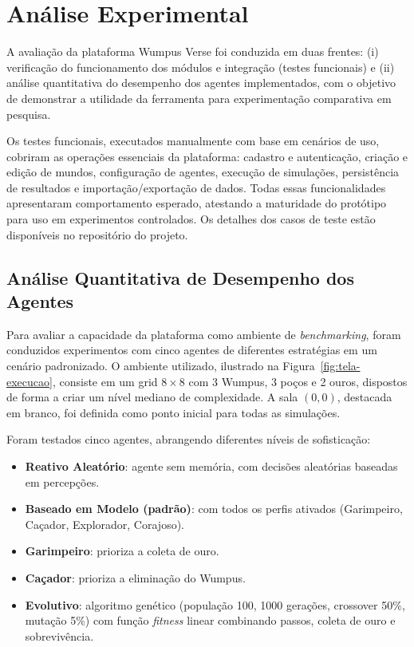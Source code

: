 \section{Análise Experimental}

A avaliação da plataforma Wumpus Verse foi conduzida em duas frentes: (i) verificação do funcionamento dos módulos e integração (testes funcionais) e (ii) análise quantitativa do desempenho dos agentes implementados, com o objetivo de demonstrar a utilidade da ferramenta para experimentação comparativa em pesquisa.

Os testes funcionais, executados manualmente com base em cenários de uso, cobriram as operações essenciais da plataforma: cadastro e autenticação, criação e edição de mundos, configuração de agentes, execução de simulações, persistência de resultados e importação/exportação de dados. Todas essas funcionalidades apresentaram comportamento esperado, atestando a maturidade do protótipo para uso em experimentos controlados. Os detalhes dos casos de teste estão disponíveis no repositório do projeto.

\subsection{Análise Quantitativa de Desempenho dos Agentes}

Para avaliar a capacidade da plataforma como ambiente de \textit{benchmarking}, foram conduzidos experimentos com cinco agentes de diferentes estratégias em um cenário padronizado. O ambiente utilizado, ilustrado na Figura~\ref{fig:tela-execucao}, consiste em um grid $8 \times 8$ com 3 Wumpus, 3 poços e 2 ouros, dispostos de forma a criar um nível mediano de complexidade. A sala $(0,0)$, destacada em branco, foi definida como ponto inicial para todas as simulações.

Foram testados cinco agentes, abrangendo diferentes níveis de sofisticação:

\begin{itemize}
    \item \textbf{Reativo Aleatório}: agente sem memória, com decisões aleatórias baseadas em percepções.
    \item \textbf{Baseado em Modelo (padrão)}: com todos os perfis ativados (Garimpeiro, Caçador, Explorador, Corajoso).
    \item \textbf{Garimpeiro}: prioriza a coleta de ouro.
    \item \textbf{Caçador}: prioriza a eliminação do Wumpus.
    \item \textbf{Evolutivo}: algoritmo genético (população 100, 1000 gerações, crossover 50\%, mutação 5\%) com função \textit{fitness} linear combinando passos, coleta de ouro e sobrevivência.
\end{itemize}

